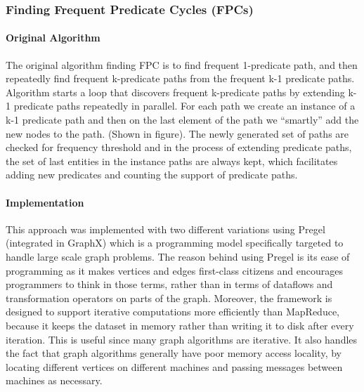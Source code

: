 \documentclass{easychair}
\begin{document}
\subsubsection{Finding Frequent Predicate Cycles (FPCs)}

\paragraph{Original Algorithm}
The original algorithm  finding FPC is to find frequent 1-predicate path, and then repeatedly  find frequent k-predicate paths from the frequent k-1 predicate paths. Algorithm starts a loop that discovers frequent k-predicate paths by extending k-1 predicate paths repeatedly in parallel. For each path  we create an instance of a k-1 predicate path and then on the last element of the path we “smartly” add the new nodes to the path. (Shown in figure). The newly generated set of paths are checked for frequency threshold and in the process of extending predicate paths, the set of last entities in the instance paths are always kept, which facilitates adding new predicates and counting the support of predicate paths.

\paragraph{Implementation}
This approach \cite{tut} was implemented with two different variations using Pregel \cite{nous} (integrated in GraphX) which is a programming model specifically targeted to handle large scale graph problems. The reason behind using Pregel is its ease of programming as  it makes vertices and edges first-class citizens and encourages programmers to think in those terms, rather than in terms of dataflows and transformation operators on parts of the graph. Moreover, the framework is designed to support iterative computations more efficiently than MapReduce, because it keeps the dataset in memory rather than writing it to disk after every iteration. This is useful since many graph algorithms are iterative. It also handles the fact that graph algorithms generally have poor memory access locality, by locating different vertices on different machines and passing messages between machines as necessary.
\end{document}
